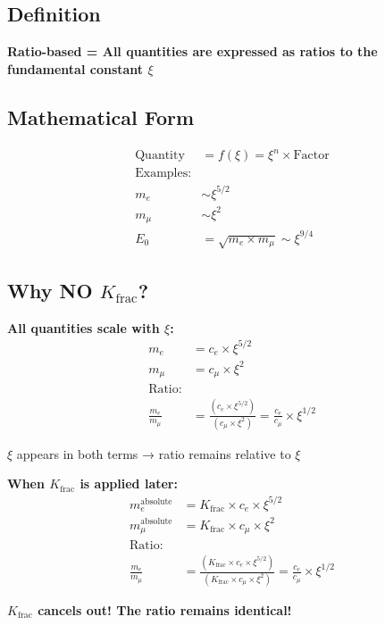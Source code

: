 	\subsection{Definition}
	
	\textbf{Ratio-based = All quantities are expressed as ratios to the fundamental constant $\xi$}
	
	\subsection{Mathematical Form}
	\begin{align*}
		\text{Quantity} &= f(\xi) = \xi^n \times \text{Factor} \\
		\text{Examples:} & \\
		m_e &\sim \xi^{5/2} \\
		m_μ &\sim \xi^2 \\
		E_0 &= \sqrt{m_e \times m_μ} \sim \xi^{9/4}
	\end{align*}
	
	\subsection{Why NO $K_{\text{frac}}$?}
	
	\textbf{All quantities scale with $\xi$:}
	\begin{align*}
		m_e &= c_e \times \xi^{5/2} \\
		m_μ &= c_μ \times \xi^2 \\
		\text{Ratio:} & \\
		\frac{m_e}{m_μ} &= \frac{(c_e \times \xi^{5/2})}{(c_μ \times \xi^2)} = \frac{c_e}{c_μ} \times \xi^{1/2}
	\end{align*}
	
	$\xi$ appears in both terms → ratio remains relative to $\xi$
	
	\textbf{When $K_{\text{frac}}$ is applied later:}
	\begin{align*}
		m_e^{\text{absolute}} &= K_{\text{frac}} \times c_e \times \xi^{5/2} \\
		m_μ^{\text{absolute}} &= K_{\text{frac}} \times c_μ \times \xi^2 \\
		\text{Ratio:} & \\
		\frac{m_e}{m_μ} &= \frac{(K_{\text{frac}} \times c_e \times \xi^{5/2})}{(K_{\text{frac}} \times c_μ \times \xi^2)} = \frac{c_e}{c_μ} \times \xi^{1/2}
	\end{align*}
	
	\textbf{$K_{\text{frac}}$ cancels out! The ratio remains identical!}
	
